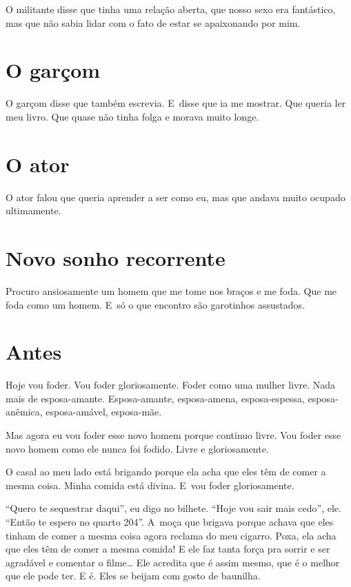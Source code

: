 O militante disse que tinha uma relação aberta, que nosso sexo era
fantástico, mas que não sabia lidar com o fato de estar se apaixonando
por mim.

\chapter{O garçom}

O garçom disse que também escrevia. E~disse que ia me mostrar. Que
queria ler meu livro. Que quase não tinha folga e morava muito longe.

\chapter{O ator}

O ator falou que queria aprender a ser como eu, mas que andava muito
ocupado ultimamente.

\chapter{Novo sonho recorrente}

Procuro ansiosamente um homem que me tome nos braços e me foda. Que me
foda como um homem. E~só o que encontro são garotinhos assustados.

\chapter{Antes}

Hoje vou foder. Vou foder gloriosamente. Foder como uma mulher livre.
Nada mais de esposa-amante. Esposa-amante, esposa-amena, esposa-espessa,
esposa-anêmica, esposa-amável, esposa-mãe.

Mas agora eu vou foder esse novo homem porque continuo livre. Vou foder
esse novo homem como ele nunca foi fodido. Livre e gloriosamente.

O casal ao meu lado está brigando porque ela acha que eles têm de comer
a mesma coisa. Minha comida está divina. E~vou foder gloriosamente.

``Quero te sequestrar daqui'', eu digo no bilhete. ``Hoje vou sair mais
cedo'', ele. ``Então te espero no quarto 204''. A~moça que brigava
porque achava que eles tinham de comer a mesma coisa agora reclama do
meu cigarro. Poxa, ela acha que eles têm de comer a mesma comida! E ele
faz tanta força pra sorrir e ser agradável e comentar o filme…
Ele acredita que é assim mesmo, que é o melhor que ele pode ter. E é.
Eles se beijam com gosto de baunilha.

